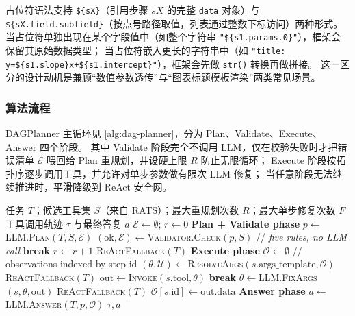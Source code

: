占位符语法支持 \verb|${sX}|（引用步骤 $sX$ 的完整 \texttt{data} 对象）与 \verb|${sX.field.subfield}|（按点号路径取值，列表通过整数下标访问）两种形式。
当占位符单独出现在某个字段值中（如整个字符串 \verb|"${s1.params.0}"|），框架会保留其原始数据类型；
当占位符嵌入更长的字符串中（如 \verb|"title: y=${s1.slope}x+${s1.intercept}"|），框架会先做 \texttt{str()} 转换再做拼接。
这一区分的设计动机是兼顾“数值参数透传”与“图表标题模板渲染”两类常见场景。

\subsubsection{算法流程}

DAGPlanner 主循环见 \autoref{alg:dag-planner}，分为 Plan、Validate、Execute、Answer 四个阶段。
其中 Validate 阶段完全不调用 LLM，仅在校验失败时才把错误清单 $\mathcal{E}$ 喂回给 Plan 重规划，并设硬上限 $R$ 防止无限循环；
Execute 阶段按拓扑序逐步调用工具，并允许对单步参数做有限次 LLM 修复；
当任意阶段无法继续推进时，平滑降级到 ReAct 安全网。

\begin{algorithm}[ht]
\caption{DAGPlanner: Structured DAG-based Task Planning}
\label{alg:dag-planner}
\begin{algorithmic}[1]
\REQUIRE 任务 $T$；候选工具集 $S$（来自 RATS）；最大重规划次数 $R$；最大单步修复次数 $F$
\ENSURE 工具调用轨迹 $\tau$ 与最终答复 $a$
\STATE $\mathcal{E}\gets\emptyset$;\; $r\gets 0$
\STATE \textbf{Plan + Validate phase}
    \STATE $p\gets$\textsc{LLM.Plan}$(T, S, \mathcal{E})$
    \STATE $(\text{ok}, \mathcal{E})\gets$\textsc{Validator.Check}$(p, S)$ \quad // \emph{five rules, no LLM call}
        \STATE \textbf{break}
    \ENDIF
    \STATE $r\gets r+1$
\ENDWHILE
{}
    \RETURN \textsc{ReActFallback}$(T)$
\ENDIF
\STATE \textbf{Execute phase}
\STATE $\mathcal{O}\gets\emptyset$ \quad // observations indexed by step id
    \STATE $(\theta,\mathcal{U})\gets$\textsc{ResolveArgs}$(s.\text{args\_template}, \mathcal{O})$
        \RETURN \textsc{ReActFallback}$(T)$
    \ENDIF
        \STATE $\mathrm{out}\gets$\textsc{Invoke}$(s.\text{tool}, \theta)$
            \STATE \textbf{break}
        \ENDIF
        \STATE $\theta\gets$\textsc{LLM.FixArgs}$(s, \theta, \mathrm{out})$
    \ENDFOR
        \RETURN \textsc{ReActFallback}$(T)$
    \ENDIF
    \STATE $\mathcal{O}[s.\text{id}]\gets\mathrm{out}.\text{data}$
\ENDFOR
\STATE \textbf{Answer phase}
\STATE $a\gets$\textsc{LLM.Answer}$(T, p, \mathcal{O})$
\RETURN $\tau, a$
\end{algorithmic}
\end{algorithm}

